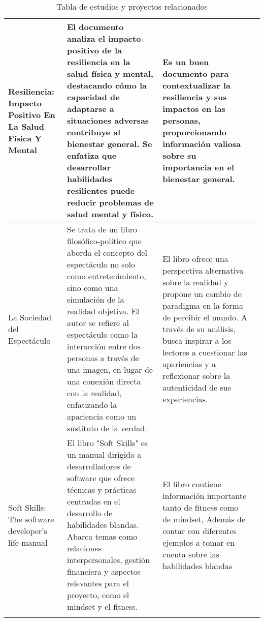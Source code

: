 \begin{longtable}{|p{3cm}|p{6cm}|p{4cm}|p{4cm}|}
\\
\hline
Resiliencia: Impacto Positivo En La Salud Física Y Mental\cite{24}
&
El documento analiza el impacto positivo de la resiliencia en la salud física y mental, destacando cómo la capacidad de adaptarse a situaciones adversas contribuye al bienestar general. Se enfatiza que desarrollar habilidades resilientes puede reducir problemas de salud mental y físico.
 & 
Es un buen documento para contextualizar la resiliencia y sus impactos en las personas, proporcionando información valiosa sobre su importancia en el bienestar general.
 &  
\\
\hline
La Sociedad del Espectáculo\cite{25}
&
Se trata de un libro filosófico-político que aborda el concepto del espectáculo no solo como entretenimiento, sino como una simulación de la realidad objetiva. El autor se refiere al espectáculo como la interacción entre dos personas a través de una imagen, en lugar de una conexión directa con la realidad, enfatizando la apariencia como un sustituto de la verdad.
 & 
El libro ofrece una perspectiva alternativa sobre la realidad y propone un cambio de paradigma en la forma de percibir el mundo. A través de su análisis, busca inspirar a los lectores a cuestionar las apariencias y a reflexionar sobre la autenticidad de sus experiencias.
 &  
\\
\hline
Soft Skills: The software developer's life manual\cite{26}
&
El libro "Soft Skills" es un manual dirigido a desarrolladores de software que ofrece técnicas y prácticas centradas en el desarrollo de habilidades blandas. Abarca temas como relaciones interpersonales, gestión financiera y aspectos relevantes para el proyecto, como el mindset y el fitness.
 & 
El libro contiene información importante tanto de fitness como de mindset, Además de  contar con diferentes ejemplos a tomar en cuenta sobre las habilidades blandas

 &  
\\
\hline
\caption{Tabla de estudios y proyectos relacionados}
\label{tab:estudios}
\end{longtable}


